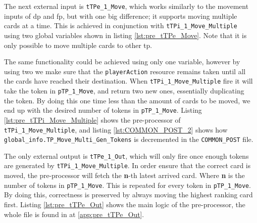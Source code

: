 \documentclass[runningheads,a4paper]{llncs}
\newcommand{\GPenSIM}{../GPenSIM}
\begin{document}
The next external input is \verb!tTPe_1_Move!, which works similarly to the movement inputs of \ac{dp} and \ac{fp}, but with one big difference; it supports moving multiple cards at a time. This is achieved in conjunction with \verb!tTPi_1_Move_Multiple! using two global variables shown in listing \ref{lst:pre_tTPe_Move}. Note that it is only possible to move multiple cards to other \ac{tp}.


The same functionality could be achieved using only one variable, however by using two we make sure that the \verb!playerAction! resource remains taken until all the cards have reached their destination. When \verb!tTPi_1_Move_Multiple! fire it will take the token in \verb!pTP_1_Move!, and return two new ones, essentially duplicating the token. By doing this one time less than the amount of cards to be moved, we end up with the desired number of tokens in \verb!pTP_1_Move!. Listing \ref{lst:pre_tTPi_Move_Multiple} shows the pre-processor of \verb!tTPi_1_Move_Multiple!, and listing \ref{lst:COMMON_POST_2} shows how \verb!global_info.TP_Move_Multi_Gen_Tokens! is decremented in the \verb!COMMON_POST! file.




The only external output is \verb!tTPe_1_Out!, which will only fire once enough tokens are generated by \verb!tTPi_1_Move_Multiple!. In order ensure that the correct card is moved, the pre-processor will fetch the \textbf{n}-th latest arrived card. Where \textbf{n} is the number of tokens in \verb!pTP_1_Move!. This is repeated for every token in \verb!pTP_1_Move!. By doing this, correctness is preserved by always moving the highest ranking card first. Listing \ref{lst:pre_tTPe_Out} shows the main logic of the pre-processor, the whole file is found in at \ref{app:pre_tTPe_Out}.

\end{document}

